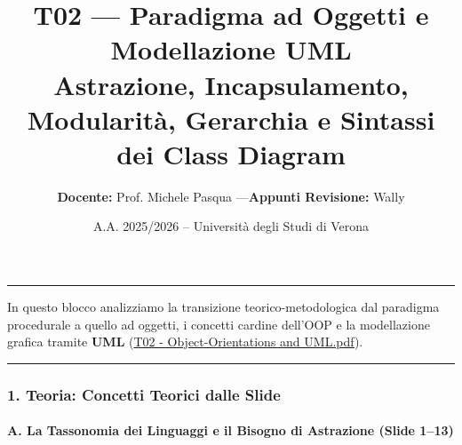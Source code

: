 \documentclass[11pt,a4paper]{article}
\title{\Huge\bfseries\sffamily\color{brandblue} T02 --- Paradigma ad Oggetti e Modellazione UML \\[0.3em] \large\sffamily Astrazione, Incapsulamento, Modularità, Gerarchia e Sintassi dei Class Diagram}
\author{\textbf{Docente:} Prof. Michele Pasqua \quad---\quad \textbf{Appunti Revisione:} Wally}
\date{A.A. 2025/2026 -- Universit\`a degli Studi di Verona}
\begin{document}
\maketitle
\thispagestyle{fancy}
\vspace{-1.2em}
\noindent\textcolor{brandblue}{\rule{\textwidth}{0.8pt}}
\vspace{1.2em}

In questo blocco analizziamo la transizione teorico-metodologica dal
paradigma procedurale a quello ad oggetti, i concetti cardine dell'OOP e
la modellazione grafica tramite \textbf{UML}
(\href{file:///home/wally/Documenti/GitHub/Programmazione-II/25-26/Teoria-e-Esercitazioni/Slides-20260902/T02\%20-\%20Object-Orientations\%20and\%20UML.pdf}{T02
- Object-Orientations and UML.pdf}).

\begin{center}\rule{0.5\linewidth}{0.5pt}\end{center}

\subsubsection{1. Teoria: Concetti Teorici dalle
Slide}\label{teoria-concetti-teorici-dalle-slide}

\paragraph{A. La Tassonomia dei Linguaggi e il Bisogno di Astrazione
(Slide
1--13)}\label{a.-la-tassonomia-dei-linguaggi-e-il-bisogno-di-astrazione-slide-113}
\end{document}

